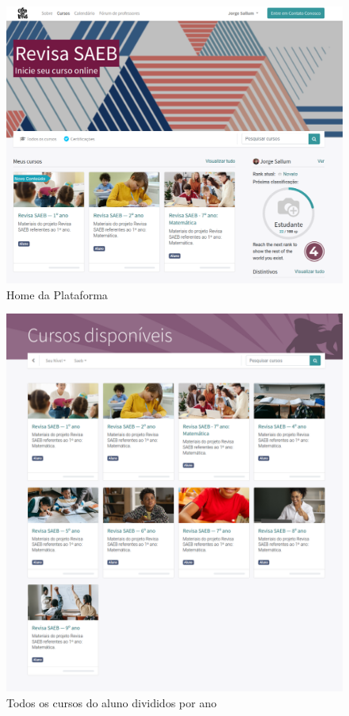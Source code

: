 \begin{figure}[h]
\includegraphics[width=\textwidth]{imgs/front}
\caption{Home da Plataforma}
\end{figure}



\begin{figure}[H]
\includegraphics[width=\textwidth]{imgs/cursos}
\caption{Todos os cursos do aluno divididos por ano}
\end{figure}


